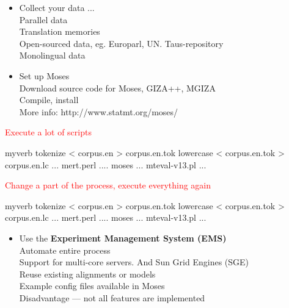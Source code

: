 \documentclass[landscape]{uedslides2C}
\begin{document}


\begin{itemize} \itemsep -1mm

\item{Collect your data} ... 
  \\ Parallel data 
  \\ Translation memories
  \\ Open-sourced data, eg. Europarl, UN. Taus-repository
  \\ Monolingual data

\item{Set up Moses}
  \\ Download source code for Moses, GIZA++, MGIZA
  \\ Compile, install
  \\ More info:
       http://www.statmt.org/moses/

\end{itemize}


{\small

\begin{center}
\textcolor{red}{Execute a lot of scripts} \\
\begin{SaveVerbatim}{myverb}
tokenize < corpus.en > corpus.en.tok
lowercase < corpus.en.tok > corpus.en.lc
...
mert.perl ....
moses ...
mteval-v13.pl ...
\end{SaveVerbatim}
\colorbox{gray}{}

\vspace{10mm}
\textcolor{red}{Change a part of the process, execute everything again} \\
\begin{SaveVerbatim}{myverb}
tokenize < corpus.en > corpus.en.tok
lowercase < corpus.en.tok > corpus.en.lc
...
mert.perl ....
moses ...
mteval-v13.pl ...
\end{SaveVerbatim}
\colorbox{gray}{}
\end{center}
}



\begin{itemize} \itemsep -1mm

\item{Use the {\bf Experiment Management System (EMS)} } 
   \\ Automate entire process
   \\ Support for multi-core servers. And Sun Grid Engines (SGE)
   \\ Reuse existing alignments or models
   \\ Example config files available in Moses
   \\ Disadvantage --- not all features are implemented

\end{itemize}
\end{document}

